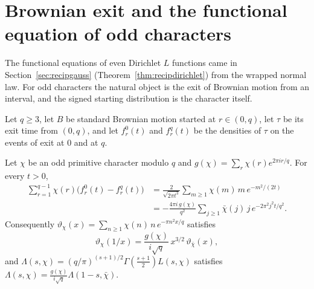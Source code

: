 \section{Brownian exit and the functional equation of odd characters}\label{sec:hitexit}

The functional equations of even Dirichlet $L$ functions came in Section~\ref{sec:recipgauss} (Theorem~\ref{thm:recipdirichlet}) from the wrapped normal law. For odd characters the natural object is the exit of Brownian motion from an interval, and the signed starting distribution is the character itself.

Let $q\ge3$, let $B$ be standard Brownian motion started at $r\in(0,q)$, let $\tau$ be its exit time from $(0,q)$, and let $f_r^0(t)$ and $f_r^q(t)$ be the densities of $\tau$ on the events of exit at $0$ and at $q$.

\begin{theorem}\label{thm:hitexit}
Let $\chi$ be an odd primitive character modulo $q$ and $g(\chi)=\sum_r\chi(r)e^{2\pi ir/q}$. For every $t>0$,
\[
\begin{split}
\sum_{r=1}^{q-1}\chi(r)\bigl(f_r^0(t)-f_r^q(t)\bigr)&=\frac2{\sqrt{2\pi t^3}}\sum_{m\ge1}\chi(m)\,m\,e^{-m^2/(2t)}\\
&=-\frac{4\pi i\,g(\chi)}{q^2}\sum_{j\ge1}\bar\chi(j)\,j\,e^{-2\pi^2j^2t/q^2}.
\end{split}
\]
Consequently $\vartheta_\chi(x)=\sum_{n\ge1}\chi(n)\,n\,e^{-\pi n^2x/q}$ satisfies
\[
\vartheta_\chi(1/x)=\frac{g(\chi)}{i\sqrt q}\,x^{3/2}\,\vartheta_{\bar\chi}(x),
\]
and $\Lambda(s,\chi)=(q/\pi)^{(s+1)/2}\Gamma(\frac{s+1}2)L(s,\chi)$ satisfies $\Lambda(s,\chi)=\frac{g(\chi)}{i\sqrt q}\Lambda(1-s,\bar\chi)$.
\end{theorem}

